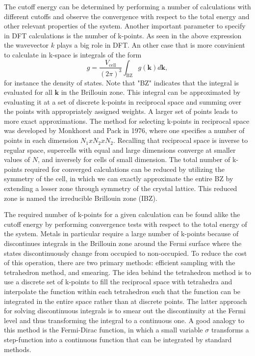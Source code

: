 The cutoff energy can be determined by performing a number of calculations with different cutoffs and observe the convergence with respect to the total energy and other relevant properties of the system. Another important parameter to specify in DFT calculations is the number of k-points. As seen in the above expression the wavevector $k$ plays a big role in DFT. An other case that is more convinient to calculate in k-space is integrals of the form 
\begin{equation}
    g = \frac{V_{\text{cell}}}{(2\pi)^3} \int_{\text{BZ}} g(\boldsymbol{k})d\boldsymbol{k},
\end{equation}
for instance the density of states. Note that "BZ" indicates that the integral is evaluated for all $\boldsymbol{k}$ in the Brillouin zone. This integral can be approximated by evaluating it at a set of discrete k-points in reciprocal space and summing over the points with appropriately assigned weights. A larger set of points leads to more exact approximations. The method for selecting k-points in reciprocal space was developed by Monkhorst and Pack in 1976, where one specifies a number of points in each dimension $N_1 x N_2 x N_2$. Recalling that reciprocal space is inverse to regular space, supercells with equal and large dimensions converge at smaller values of $N$, and inversely for cells of small dimension. The total number of k-points required for converged calculations can be reduced by utilizing the symmetry of the cell, in which we can exactly approximate the entire BZ by extending a lesser zone through symmetry of the crystal lattice. This reduced zone is named the irreducible Brillouin zone (IBZ). 

The required number of k-points for a given calculation can be found alike the cutoff energy by performing convergence tests with respect to the total energy of the system. Metals in particular require a large number of k-points because of discontinues integrals in the Brillouin zone around the Fermi surface where the states discontinuously change from occupied to non-occupied. To reduce the cost of this operation, there are two primary methods: efficient sampling with the tetrahedron method, and smearing. The idea behind the tetrahedron method is to use a discrete set of k-points to fill the reciprocal space with tetrahedra and interpolate the function within each tetrahedron such that the function can be integrated in the entire space rather than at discrete points. The latter approach for solving discontinuous integrals is to smear out the discontinuity at the Fermi level and thus transforming the integral to a continuous one. A good analogy to this method is the Fermi-Dirac function, in which a small variable $\sigma$ transforms a step-function into a continuous function that can be integrated by standard methods.

